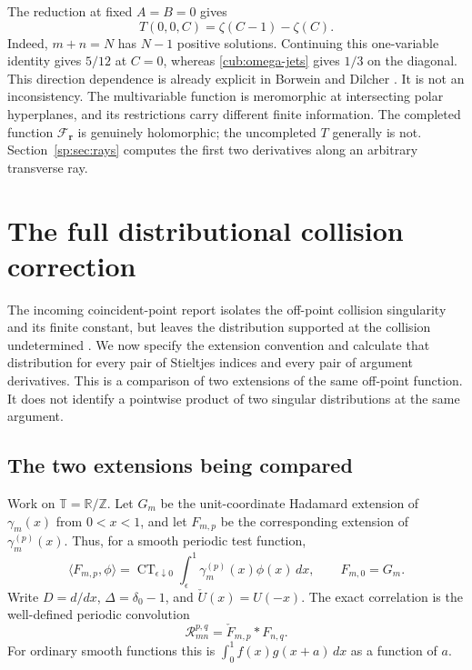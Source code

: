 \documentclass[11pt,a4paper]{article}
\theoremstyle{definition}
\theoremstyle{remark}
\DeclareMathOperator{\CT}{CT}
\numberwithin{equation}{section}
\begin{document}
The reduction at fixed $A=B=0$ gives
\begin{equation}\label{cub:C-axis}
 T(0,0,C)=\zeta(C-1)-\zeta(C).
\end{equation}
Indeed, $m+n=N$ has $N-1$ positive solutions.  Continuing this
one-variable identity gives $5/12$ at $C=0$, whereas
\eqref{cub:omega-jets} gives $1/3$ on the diagonal.
This direction dependence is already explicit in
Borwein and Dilcher \cite[Theorem~2.7]{BorweinDilcher}.
It is not an inconsistency.  The multivariable function is meromorphic
at intersecting polar hyperplanes, and its restrictions carry different
finite information.  The completed function
$\mathcal F_{\boldsymbol r}$ is genuinely holomorphic; the uncompleted
$T$ generally is not.  Section~\ref{sp:sec:rays} computes the first two
derivatives along an arbitrary transverse ray.


\section{The full distributional collision correction}
\label{cont:sec}

The incoming coincident-point report isolates the off-point collision
singularity and its finite constant, but leaves the distribution
supported at the collision undetermined \cite{IncomingCoincident}.
We now specify the extension convention and calculate that distribution
for every pair of Stieltjes indices and every pair of argument
derivatives.  This is a comparison of two extensions of the same
off-point function.  It does not identify a pointwise product of two
singular distributions at the same argument.

\subsection{The two extensions being compared}

Work on $\mathbb T=\mathbb R/\mathbb Z$.  Let $G_m$ be the unit-coordinate
Hadamard extension of $\gamma_m(x)$ from $0<x<1$, and let
$F_{m,p}$ be the corresponding extension of
$\gamma_m^{(p)}(x)$.  Thus, for a smooth periodic test function,
\begin{equation}\label{cont:finite-part}
 \langle F_{m,p},\phi\rangle
 =\CT_{\epsilon\downarrow0}
      \int_\epsilon^1\gamma_m^{(p)}(x)\phi(x)\,dx,
 \qquad F_{m,0}=G_m.
\end{equation}
Write $D=d/dx$, $\Delta=\delta_0-1$, and
$\check U(x)=U(-x)$.  The exact correlation is the well-defined
periodic convolution
\begin{equation}\label{cont:correlation}
 \mathcal R_{mn}^{p,q}=\check F_{m,p}*F_{n,q}.
\end{equation}
For ordinary smooth functions this is
$\int_0^1 f(x)g(x+a)\,dx$ as a function of $a$.
\end{document}
